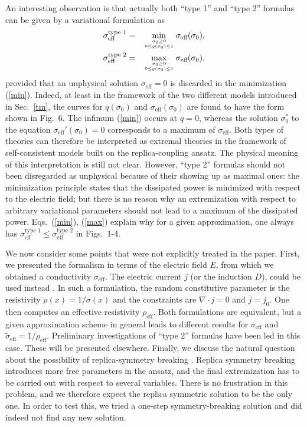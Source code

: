 An interesting observation is that actually both ``type 1''
and ``type 2'' formulas can be given by a variational formulation as
\begin{eqnarray}
\label{min}
\sigma_{\text{eff}}^{\text{type 1}}&=& \min_{\sigma_0\geq 0\atop 0\leq q(\sigma_0)\leq 1}\sigma_{\text{eff}}(\sigma_0),\\
\label{max}
\sigma_{\text{eff}}^{\text{type 2}}&=&
\max_{\sigma_0\geq 0\atop 0\leq q(\sigma_0)\leq 1}
\sigma_{\text{eff}}(\sigma_0),
\end{eqnarray}
provided that an unphysical solution $\sigma_{\text{eff}}=0$ is
discarded in the minimization (\ref{min}). Indeed, at least in the
framework of the two different models introduced in Sec.\ \ref{tm},
the curves for $q(\sigma_0)$ and $\sigma_{\text{eff}}(\sigma_0)$ are
found to have the form shown in Fig.\ 6. The infimum (\ref{min})
occurs at $q=0$, whereas the solution $\sigma_0^*$ to the equation
$\sigma_{\text{eff}}'(\sigma_0)=0$ corresponds to a maximum of
$\sigma_{\text{eff}}$. Both types of theories can therefore be
interpreted as extremal theories in the framework of self-consistent
models built on the replica-coupling ansatz. The physical meaning of
this interpretation is still not clear. However, ``type 2''
formulas should not been disregarded as unphysical because of their
showing up as maximal ones: the minimization principle states that the
dissipated power is minimized with respect to the electric field; but
there is no reason why an extremization with respect to arbitrary
variational parameters should not lead to a maximum of the dissipated
power. Eqs.\ (\ref{min}), (\ref{max}) explain why for a given
approximation, one always has $\sigma_{\text{eff}}^{\text{type 1}}
\leq\sigma_{\text{eff}}^{\text{type 2}}$ in Figs.\ 1-4.

We now consider some points that were not explicitly treated in the
paper. First, we presented the formalism in terms of the electric
field $E$, from which we obtained a conductivity
$\sigma_{\text{eff}}$. The electric current $j$ (or the induction
$D$), could be used instead \cite{BART98}. In such a formulation, the
random constitutive parameter is the resistivity $\rho(x)=1/\sigma(x)$
and the constraints are $\nabla\cdot j=0$ and $\overline{j}=j_0$. One
then computes an effective resistivity $\rho_{\text{eff}}$. Both
formulations are equivalent, but a given approximation scheme in
general leads to different results for $\sigma_{\text{eff}}$ and
$\tilde{\sigma}_{\text{eff}}=1/\rho_{\text{eff}}$. Preliminary
investigations of ``type 2'' formulas have been led in this
case. These will be presented elsewhere. Finally, we discuss the
natural question about the possibility of replica-symmetry breaking
\cite{PARI84}. Replica symmetry breaking introduces more free
parameters in the ansatz, and the final extremization has to be
carried out with respect to several variables. There is no frustration
in this problem, and we therefore expect the replica symmetric
solution to be the only one. In order to test this, we tried a one-step
symmetry-breaking solution and did indeed not find any new solution.

